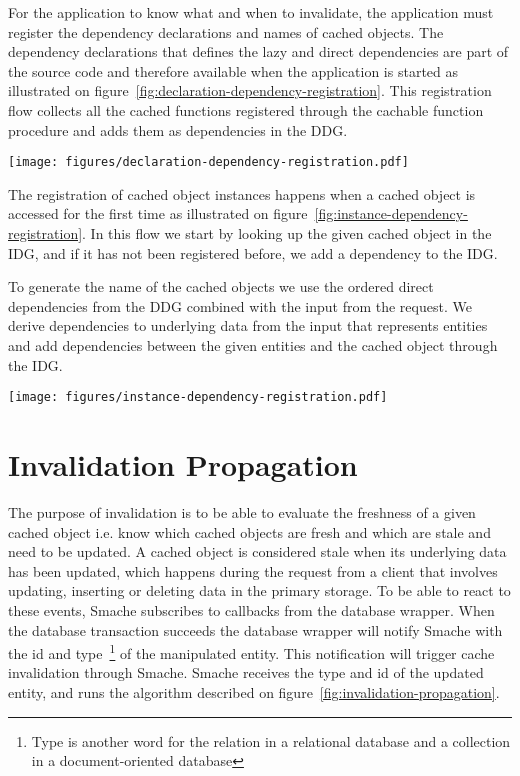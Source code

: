 For the application to know what and when to invalidate, the application must register the dependency declarations and names of cached objects. The dependency declarations that defines the lazy and direct dependencies are part of the source code and therefore available when the application is started as illustrated on figure~\ref{fig:declaration-dependency-registration}. This registration flow collects all the cached functions registered through the cachable function procedure and adds them as dependencies in the DDG.

\begin{figure*}[ht!]
  \centering
  \texttt{[image: figures/declaration-dependency-registration.pdf]}
  \caption{The flow in which lazy and direct dependencies are registered from the declarations}
  \label{fig:declaration-dependency-registration}
\end{figure*}

The registration of cached object instances happens when a cached object is accessed for the first time as illustrated on figure~\ref{fig:instance-dependency-registration}. In this flow we start by looking up the given cached object in the IDG, and if it has not been registered before, we add a dependency to the IDG.

To generate the name of the cached objects we use the ordered direct dependencies from the DDG combined with the input from the request. We derive dependencies to underlying data from the input that represents entities and add dependencies between the given entities and the cached object through the IDG.

\begin{figure*}[ht!]
  \centering
  \texttt{[image: figures/instance-dependency-registration.pdf]}
  \caption{The flow in which cached object instances are accessed when they are accessed the first time}
  \label{fig:instance-dependency-registration}
\end{figure*}

\section{Invalidation Propagation}
\label{sec:invalidation-propagation}

The purpose of invalidation is to be able to evaluate the freshness of a given cached object i.e. know which cached objects are fresh and which are stale and need to be updated. A cached object is considered stale when its underlying data has been updated, which happens during the request from a client that involves updating, inserting or deleting data in the primary storage. To be able to react to these events, Smache subscribes to callbacks from the database wrapper. When the database transaction succeeds the database wrapper will notify Smache with the id and type~\footnote{Type is another word for the relation in a relational database and a collection in a document-oriented database} of the manipulated entity. This notification will trigger cache invalidation through Smache. Smache receives the type and id of the updated entity, and runs the algorithm described on figure~\ref{fig:invalidation-propagation}.

